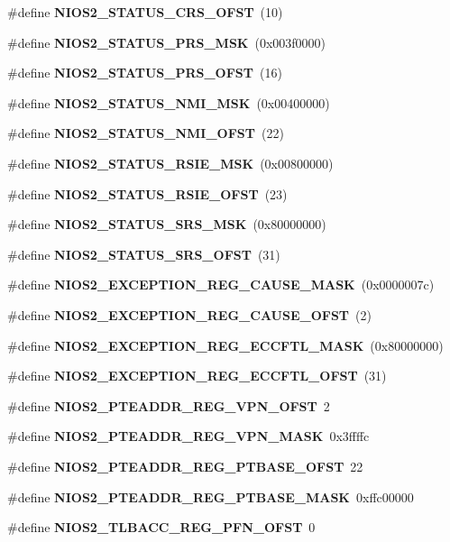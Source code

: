 \begin{DoxyCompactItemize}
\item 
\#define {\bf N\+I\+O\+S2\+\_\+\+S\+T\+A\+T\+U\+S\+\_\+\+C\+R\+S\+\_\+\+O\+F\+ST}~(10)
\item 
\#define {\bf N\+I\+O\+S2\+\_\+\+S\+T\+A\+T\+U\+S\+\_\+\+P\+R\+S\+\_\+\+M\+SK}~(0x003f0000)
\item 
\#define {\bf N\+I\+O\+S2\+\_\+\+S\+T\+A\+T\+U\+S\+\_\+\+P\+R\+S\+\_\+\+O\+F\+ST}~(16)
\item 
\#define {\bf N\+I\+O\+S2\+\_\+\+S\+T\+A\+T\+U\+S\+\_\+\+N\+M\+I\+\_\+\+M\+SK}~(0x00400000)
\item 
\#define {\bf N\+I\+O\+S2\+\_\+\+S\+T\+A\+T\+U\+S\+\_\+\+N\+M\+I\+\_\+\+O\+F\+ST}~(22)
\item 
\#define {\bf N\+I\+O\+S2\+\_\+\+S\+T\+A\+T\+U\+S\+\_\+\+R\+S\+I\+E\+\_\+\+M\+SK}~(0x00800000)
\item 
\#define {\bf N\+I\+O\+S2\+\_\+\+S\+T\+A\+T\+U\+S\+\_\+\+R\+S\+I\+E\+\_\+\+O\+F\+ST}~(23)
\item 
\#define {\bf N\+I\+O\+S2\+\_\+\+S\+T\+A\+T\+U\+S\+\_\+\+S\+R\+S\+\_\+\+M\+SK}~(0x80000000)
\item 
\#define {\bf N\+I\+O\+S2\+\_\+\+S\+T\+A\+T\+U\+S\+\_\+\+S\+R\+S\+\_\+\+O\+F\+ST}~(31)
\item 
\#define {\bf N\+I\+O\+S2\+\_\+\+E\+X\+C\+E\+P\+T\+I\+O\+N\+\_\+\+R\+E\+G\+\_\+\+C\+A\+U\+S\+E\+\_\+\+M\+A\+SK}~(0x0000007c)
\item 
\#define {\bf N\+I\+O\+S2\+\_\+\+E\+X\+C\+E\+P\+T\+I\+O\+N\+\_\+\+R\+E\+G\+\_\+\+C\+A\+U\+S\+E\+\_\+\+O\+F\+ST}~(2)
\item 
\#define {\bf N\+I\+O\+S2\+\_\+\+E\+X\+C\+E\+P\+T\+I\+O\+N\+\_\+\+R\+E\+G\+\_\+\+E\+C\+C\+F\+T\+L\+\_\+\+M\+A\+SK}~(0x80000000)
\item 
\#define {\bf N\+I\+O\+S2\+\_\+\+E\+X\+C\+E\+P\+T\+I\+O\+N\+\_\+\+R\+E\+G\+\_\+\+E\+C\+C\+F\+T\+L\+\_\+\+O\+F\+ST}~(31)
\item 
\#define {\bf N\+I\+O\+S2\+\_\+\+P\+T\+E\+A\+D\+D\+R\+\_\+\+R\+E\+G\+\_\+\+V\+P\+N\+\_\+\+O\+F\+ST}~2
\item 
\#define {\bf N\+I\+O\+S2\+\_\+\+P\+T\+E\+A\+D\+D\+R\+\_\+\+R\+E\+G\+\_\+\+V\+P\+N\+\_\+\+M\+A\+SK}~0x3ffffc
\item 
\#define {\bf N\+I\+O\+S2\+\_\+\+P\+T\+E\+A\+D\+D\+R\+\_\+\+R\+E\+G\+\_\+\+P\+T\+B\+A\+S\+E\+\_\+\+O\+F\+ST}~22
\item 
\#define {\bf N\+I\+O\+S2\+\_\+\+P\+T\+E\+A\+D\+D\+R\+\_\+\+R\+E\+G\+\_\+\+P\+T\+B\+A\+S\+E\+\_\+\+M\+A\+SK}~0xffc00000
\item 
\#define {\bf N\+I\+O\+S2\+\_\+\+T\+L\+B\+A\+C\+C\+\_\+\+R\+E\+G\+\_\+\+P\+F\+N\+\_\+\+O\+F\+ST}~0

\end{DoxyCompactItemize}
